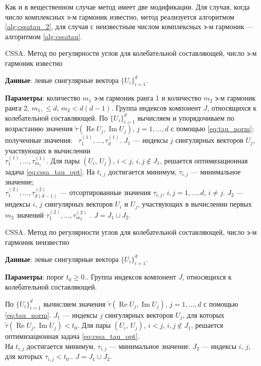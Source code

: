 \documentclass[specialist,
               substylefile = spbu.rtx,
               subf,href,colorlinks=true, 12pt]{disser}
\def\RE{\mathop{\mathrm{Re}}}
\def\IM{\mathop{\mathrm{Im}}}
\begin{document}
Как и в вещественном случае метод имеет две модификации. Для случая, когда число комплексных э-м гармоник известно, метод реализуется алгоритмом \ref{alg:cssatau_2}, для случая с неизвестным числом комплексных э-м гармоник --- алгоритмом \ref{alg:cssatau}. 

\begin{algorithm}[!hhh]
\caption{CSSA. Метод по регулярности углов для колебательной составляющей, число э-м гармоник известно}
\label{alg:cssatau_2}
\begin{algorithmic}[1]
\REQUIRE 
\item \textbf{Данные}: левые сингулярные вектора $\{U_i\}_{i=1}^{d}$.
\item \textbf{Параметры}: количество $m_1$ э-м гармоник ранга 1 и количество $m_2$ э-м гармоник ранга 2,  $m_1,  \leqslant d$, $m_2 < d(d-1)$.
\ENSURE Группа индексов компонент $J$, относящихся к колебательной составляющей.
\STATE По $\{U_i\}_{i=1}^{d}$ вычисляем и упорядочиваем по возрастанию значения $\tilde{\tau}(\RE U_j, \IM U_j)$, $j=1,\ldots, d$ с помощью \eqref{eq:tau_norm}; полученные значения: \ $\tau_1^{(1)}, \ldots, \tau_{d}^{(1)}$.
\STATE  $J_1$ --- индексы $j$ сингулярных векторов $U_j$, участвующих в вычислении\\ $\tau_1^{(1)}, \ldots, \tau_{m_1}^{(1)}$.
\STATE Для пары $(U_i,\,U_j)$, $i<j$, $i,j \not \in J_1$, решается оптимизационная задача \eqref{eq:cssa_tau_opt}.
На $t_{i,j}$ достигается минимум, $\tau_{i,j}$ --- минимальное значение;\\
$\tau_1^{(2)}, \ldots, \tau_{d(d-1)}^{(2)}$ --- отсортированные значения $\tau_{i,j}$, $i,j=1,\ldots, d$, $i \not = j$.
\STATE  $J_2$ --- индексы $i$, $j$ сингулярных векторов $U_i$ и $U_j$, участвующих в вычислении первых $m_2$ значений $\tau_1^{(2)}, \ldots, \tau_{m_2}^{(2)}$ .
\STATE $J = J_1 \cup J_2$.
\end{algorithmic}
\end{algorithm}

\begin{algorithm}[!hhh]
\caption{CSSA. Метод по регулярности углов для колебательной составляющей, число э-м гармоник неизвестно}
\label{alg:cssatau}
\begin{algorithmic}[1]
\REQUIRE 
\item \textbf{Данные}: левые сингулярные вектора $\{U_i\}_{i=1}^{d}$.
\item \textbf{Параметры}: порог $t_0 \geqslant 0$..
\ENSURE Группа индексов компонент $J$, относящихся к колебательной составляющей.

\STATE По $\{U_i\}_{i=1}^{d}$ вычисляем значения $\tilde{\tau}(\RE U_j, \IM U_j)$, $j=1,\ldots, d$ с помощью \eqref{eq:tau_norm}.
\STATE  $J_1$ --- индексы $j$ сингулярных векторов $U_j$, для которых $\tilde{\tau}(\RE U_j, \IM U_j) < t_0$.
\STATE Для пары $(U_i,\,U_j)$, $i<j$, $i,j \not \in J_1$, решается оптимизационная задача \eqref{eq:cssa_tau_opt}. \\
На $t_{i,j}$ достигается минимум, $\tau_{i,j}$ --- минимальное значение.
\STATE  $J_2$ --- индексы $i$, $j$, для которых  $\tau_{i,j} < t_0$..
\STATE $J = J_1 \cup J_2$.
\end{algorithmic}
\end{algorithm}
\end{document}
